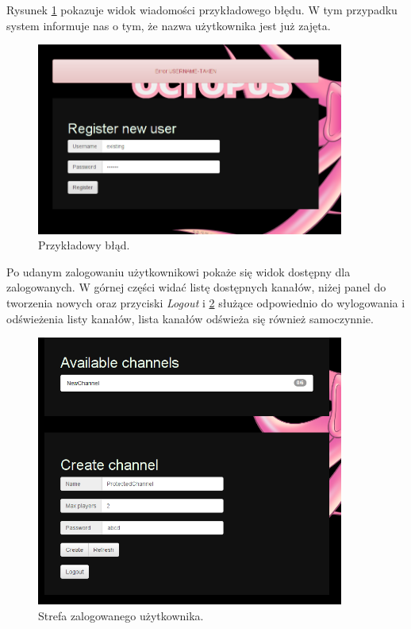 Rysunek \ref{fig:error-example} pokazuje widok wiadomości przykładowego błędu. W tym przypadku system informuje nas o tym, że nazwa użytkownika jest już zajęta.

\begin{figure}[ht]
    \centering
    \includegraphics[width=0.9\textwidth]{imgs/error.png}
    \caption{Przykładowy błąd.}
    \label{fig:error-example}
\end{figure}

Po udanym zalogowaniu użytkownikowi pokaże się widok dostępny dla zalogowanych. W górnej części widać listę dostępnych kanałów, niżej panel do tworzenia nowych oraz przyciski \emph{Logout} i \ref{fig:zone} służące odpowiednio do wylogowania i odświeżenia listy kanałów, lista kanałów odświeża się również samoczynnie.

\begin{figure}[ht]
    \centering
    \includegraphics[width=0.9\textwidth]{imgs/beforeCreation.png}
    \caption{Strefa zalogowanego użytkownika.}
    \label{fig:zone}
\end{figure}


